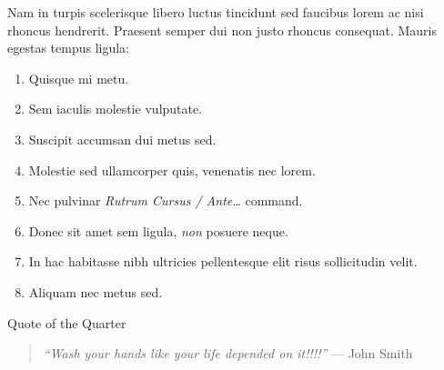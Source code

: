 \documentclass[10pt]{article} %
\begin{document}
\begin{minipage}[t]{.66\linewidth}
\begin{multicols}{2}
\BackToContents %

\end{multicols}


\begin{mdframed}[style=intextbox,frametitle={}] %

\hypertarget{descriptivebox}{} %

Nam in turpis scelerisque libero luctus tincidunt sed faucibus lorem ac nisi rhoncus hendrerit. Praesent semper dui non justo rhoncus consequat. Mauris egestas tempus ligula:
\begin{enumerate}
\item Quisque mi metu.      
\item Sem iaculis molestie vulputate.
\item Suscipit accumsan dui metus sed.
\item Molestie sed ullamcorper quis, venenatis nec lorem.
\item Nec pulvinar \textsl{Rutrum Cursus / Ante\dots} command.      
\item Donec sit amet sem ligula,  \textsl{non} posuere neque. 
\item In hac habitasse nibh ultricies pellentesque elit risus sollicitudin velit.
\item Aliquam nec metus sed.
\end{enumerate}

\BackToContents %

\end{mdframed}


\hypertarget{quotation}{{\large Quote of the Quarter}} %

\begin{quote}
\textsl{``Wash your hands like your life  depended on it!!!!''} --- \textrm{John Smith}
\end{quote}


\end{minipage}\hfill %
\end{document}
